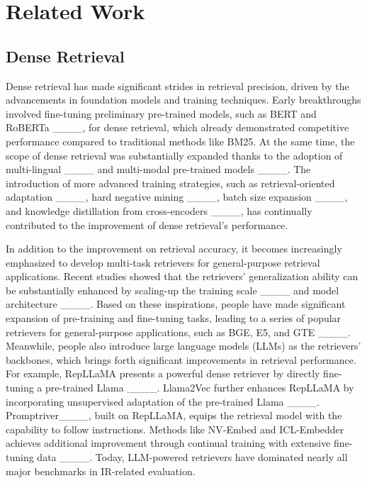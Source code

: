 \section{Related Work}

\subsection{Dense Retrieval}
Dense retrieval has made significant strides in retrieval precision, driven by the advancements in foundation models and training techniques. Early breakthroughs involved fine-tuning preliminary pre-trained models, such as BERT and RoBERTa ____, for dense retrieval, which already demonstrated competitive performance compared to traditional methods like BM25. At the same time, the scope of dense retrieval was substantially expanded thanks to the adoption of multi-lingual ____ and multi-modal pre-trained models ____. The introduction of more advanced training strategies, such as retrieval-oriented adaptation ____, hard negative mining ____, batch size expansion ____, and knowledge distillation from cross-encoders ____, has continually contributed to the improvement of dense retrieval's performance. 

In addition to the improvement on retrieval accuracy, it becomes increasingly emphasized to develop multi-task retrievers for general-purpose retrieval applications. Recent studies showed that the retrievers' generalization ability can be substantially enhanced by scaling-up the training scale ____ and model architecture ____. Based on these inspirations, people have made significant expansion of pre-training and fine-tuning tasks, leading to a series of popular retrievers for general-purpose applications, such as BGE, E5, and GTE ____. Meanwhile, people also introduce large language models (LLMs) as the retrievers' backbones, which brings forth significant improvements in retrieval performance. For example, RepLLaMA presents a powerful dense retriever by directly fine-tuning a pre-trained Llama ____. Llama2Vec further enhances RepLLaMA by incorporating unsupervised adaptation of the pre-trained Llama ____. Promptriver____, built on RepLLaMA, equips the retrieval model with the capability to follow instructions. Methods like NV-Embed and ICL-Embedder achieves additional improvement through continual training with extensive fine-tuning data ____. Today, LLM-powered retrievers have dominated nearly all major benchmarks in IR-related evaluation. 

